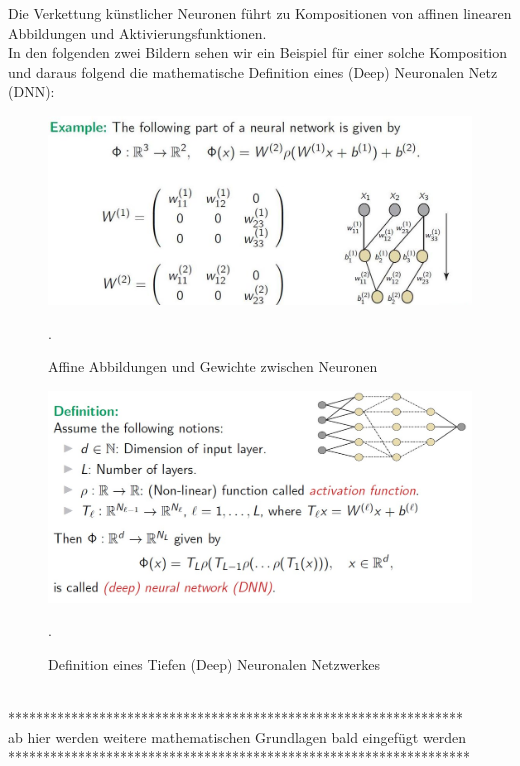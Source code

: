 \documentclass[12pt]{article}
\begin{document}
Die Verkettung künstlicher Neuronen führt zu Kompositionen von affinen linearen Abbildungen und Aktivierungsfunktionen.\\
In den folgenden zwei Bildern sehen wir ein Beispiel für einer solche Komposition und daraus folgend die mathematische Definition eines (Deep) Neuronalen Netz (DNN): 
\begin{figure}[ht]
  \centering
  \hspace*{-0.5cm} 
  \includegraphics[width=1.15\textwidth]{Mapping+Weights}
  \caption{Affine Abbildungen und Gewichte zwischen Neuronen}.\\[0.2cm]      
  \label{fig:Map+Weights}
\end{figure}
%
\begin{figure}[ht]
  \centering
  \hspace*{-0.2cm} 
  \includegraphics[width=1.1\textwidth]{Definition-Deep-NN}
  \caption{Definition eines Tiefen (Deep) Neuronalen Netzwerkes}.\\[0.2cm]      
  \label{fig:def-DNN}
\end{figure}\\
%
{\color{blue} {*****************************************************************\\
ab hier werden weitere mathematischen Grundlagen bald eingefügt werden\\
******************************************************************}}
%
\end{document}
